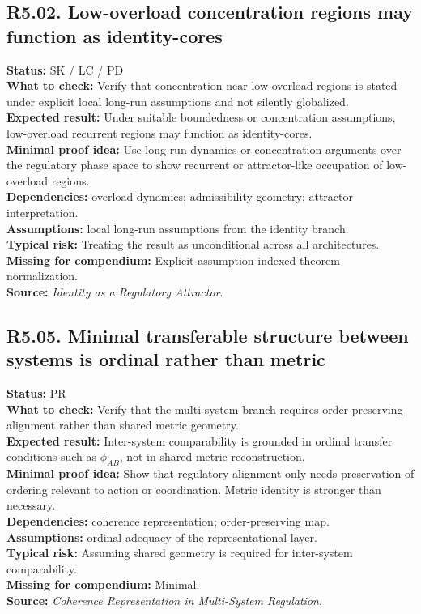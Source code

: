 \documentclass[12pt]{article}
\begin{document}
	\subsection*{R5.02. Low-overload concentration regions may function as identity-cores}
	\textbf{Status:} SK / LC / PD \\
	\textbf{What to check:} Verify that concentration near low-overload regions is stated under explicit local long-run assumptions and not silently globalized. \\
	\textbf{Expected result:} Under suitable boundedness or concentration assumptions, low-overload recurrent regions may function as identity-cores. \\
	\textbf{Minimal proof idea:} Use long-run dynamics or concentration arguments over the regulatory phase space to show recurrent or attractor-like occupation of low-overload regions. \\
	\textbf{Dependencies:} overload dynamics; admissibility geometry; attractor interpretation. \\
	\textbf{Assumptions:} local long-run assumptions from the identity branch. \\
	\textbf{Typical risk:} Treating the result as unconditional across all architectures. \\
	\textbf{Missing for compendium:} Explicit assumption-indexed theorem normalization. \\
	\textbf{Source:} \emph{Identity as a Regulatory Attractor}.
	
	\subsection*{R5.05. Minimal transferable structure between systems is ordinal rather than metric}
	\textbf{Status:} PR \\
	\textbf{What to check:} Verify that the multi-system branch requires order-preserving alignment rather than shared metric geometry. \\
	\textbf{Expected result:} Inter-system comparability is grounded in ordinal transfer conditions such as $\phi_{AB}$, not in shared metric reconstruction. \\
	\textbf{Minimal proof idea:} Show that regulatory alignment only needs preservation of ordering relevant to action or coordination. Metric identity is stronger than necessary. \\
	\textbf{Dependencies:} coherence representation; order-preserving map. \\
	\textbf{Assumptions:} ordinal adequacy of the representational layer. \\
	\textbf{Typical risk:} Assuming shared geometry is required for inter-system comparability. \\
	\textbf{Missing for compendium:} Minimal. \\
	\textbf{Source:} \emph{Coherence Representation in Multi-System Regulation}.
	
\end{document}
